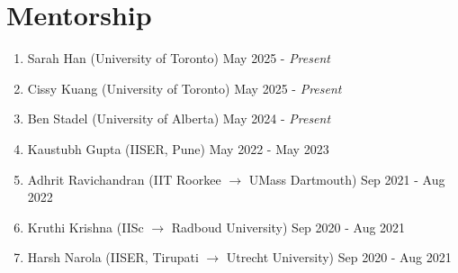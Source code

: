 	
		\section{Mentorship}
		\begin{enumerate}[leftmargin=*]
			\item Sarah Han (University of Toronto) \hfill May 2025 - \textit{Present}
			\item Cissy Kuang (University of Toronto) \hfill May 2025 - \textit{Present}
			\item Ben Stadel (University of Alberta) \hfill May 2024 - \textit{Present}
			\item Kaustubh Gupta (IISER, Pune) \hfill May 2022 - May 2023
			\item Adhrit Ravichandran (IIT Roorkee $\rightarrow$ UMass Dartmouth) \hfill Sep 2021 - Aug 2022
			\item Kruthi Krishna (IISc $ \rightarrow $ Radboud University) \hfill Sep 2020 - Aug 2021
			\item Harsh Narola (IISER, Tirupati $ \rightarrow $ Utrecht University) \hfill Sep 2020 - Aug 2021
		\end{enumerate}
		

